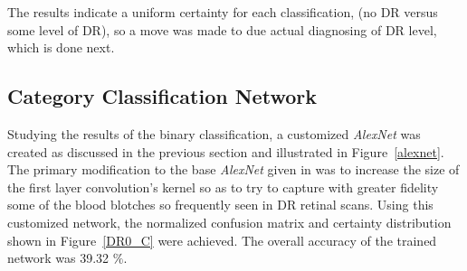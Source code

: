 \documentclass[letterpaper,12pt]{article}
\newcommand{\figref}[1]{Figure~\ref{#1}}
\begin{document}
The results indicate a uniform certainty for each classification, (no DR versus some level of DR), so a move was made to due actual diagnosing of DR level, which is done next.

\subsection{Category Classification Network}

Studying the results of the binary classification, a customized \textit{AlexNet} was created as discussed in the previous section and illustrated in \figref{alexnet}. The primary modification to the base \textit{AlexNet} given in \cite{AlexNet} was to increase the size of the first layer convolution's kernel so as to try to capture with greater fidelity some of the blood blotches so frequently seen in DR retinal scans. Using this customized network, the normalized confusion matrix and certainty distribution shown in \figref{DR0_C} were achieved. The overall accuracy of the trained network was 39.32 $\%$.
\end{document}
